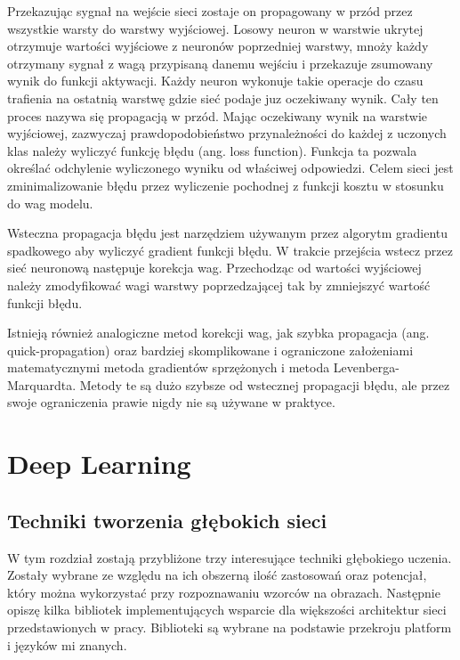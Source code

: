 \documentclass[12pt,a4paper,twoside,titlepage,openright]{book}
\begin{document}
Przekazując sygnał na wejście sieci zostaje on propagowany w przód przez wszystkie warsty do warstwy wyjściowej. Losowy neuron w warstwie ukrytej otrzymuje wartości wyjściowe z neuronów poprzedniej warstwy, mnoży każdy otrzymany sygnał z wagą przypisaną danemu wejściu i przekazuje zsumowany wynik do funkcji aktywacji. Każdy neuron wykonuje takie operacje do czasu trafienia na ostatnią warstwę gdzie sieć podaje juz oczekiwany wynik. Cały ten proces nazywa się propagacją w przód. Mając oczekiwany wynik na warstwie wyjściowej, zazwyczaj prawdopodobieństwo przynależności do każdej z uczonych klas należy wyliczyć funkcję błędu (ang. loss function). Funkcja ta pozwala określać odchylenie wyliczonego wyniku od właściwej odpowiedzi. Celem sieci jest zminimalizowanie błędu przez wyliczenie pochodnej z funkcji kosztu w stosunku do wag modelu.

Wsteczna propagacja błędu jest narzędziem używanym przez algorytm gradientu spadkowego aby wyliczyć gradient funkcji błędu. W trakcie przejścia wstecz przez sieć neuronową następuje korekcja wag. Przechodząc od wartości wyjściowej należy zmodyfikować wagi warstwy poprzedzającej tak by zmniejszyć wartość funkcji błędu.



Istnieją również analogiczne metod korekcji wag, jak szybka propagacja (ang. quick-propagation) oraz bardziej skomplikowane i ograniczone założeniami matematycznymi metoda gradientów sprzężonych i metoda Levenberga-Marquardta. Metody te są dużo szybsze od wstecznej propagacji błędu, ale przez swoje ograniczenia prawie nigdy nie są używane w praktyce. \cite{odkrywanieSieci}



\chapter{Deep Learning}
\section{Techniki tworzenia głębokich sieci}
W tym rozdział zostają przybliżone trzy interesujące techniki głębokiego uczenia. Zostały wybrane ze względu na ich obszerną ilość zastosowań oraz potencjał, który można wykorzystać przy rozpoznawaniu wzorców na obrazach. Następnie opiszę kilka bibliotek implementujących wsparcie dla większości architektur sieci przedstawionych w pracy. Biblioteki są wybrane na podstawie przekroju platform i języków mi znanych. 
\end{document}
